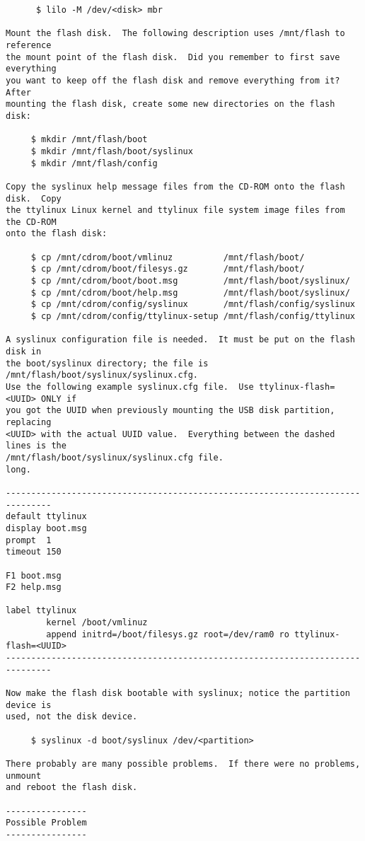 \documentclass[10pt]{article}
\begin{document}
\begin{lstlisting}
      $ lilo -M /dev/<disk> mbr

Mount the flash disk.  The following description uses /mnt/flash to reference
the mount point of the flash disk.  Did you remember to first save everything
you want to keep off the flash disk and remove everything from it?  After
mounting the flash disk, create some new directories on the flash disk:

     $ mkdir /mnt/flash/boot
     $ mkdir /mnt/flash/boot/syslinux
     $ mkdir /mnt/flash/config

Copy the syslinux help message files from the CD-ROM onto the flash disk.  Copy
the ttylinux Linux kernel and ttylinux file system image files from the CD-ROM
onto the flash disk:

     $ cp /mnt/cdrom/boot/vmlinuz          /mnt/flash/boot/
     $ cp /mnt/cdrom/boot/filesys.gz       /mnt/flash/boot/
     $ cp /mnt/cdrom/boot/boot.msg         /mnt/flash/boot/syslinux/
     $ cp /mnt/cdrom/boot/help.msg         /mnt/flash/boot/syslinux/
     $ cp /mnt/cdrom/config/syslinux       /mnt/flash/config/syslinux
     $ cp /mnt/cdrom/config/ttylinux-setup /mnt/flash/config/ttylinux

A syslinux configuration file is needed.  It must be put on the flash disk in
the boot/syslinux directory; the file is /mnt/flash/boot/syslinux/syslinux.cfg.
Use the following example syslinux.cfg file.  Use ttylinux-flash=<UUID> ONLY if
you got the UUID when previously mounting the USB disk partition, replacing
<UUID> with the actual UUID value.  Everything between the dashed lines is the
/mnt/flash/boot/syslinux/syslinux.cfg file.
long.

-------------------------------------------------------------------------------
default ttylinux
display boot.msg
prompt  1
timeout 150

F1 boot.msg
F2 help.msg

label ttylinux
        kernel /boot/vmlinuz
        append initrd=/boot/filesys.gz root=/dev/ram0 ro ttylinux-flash=<UUID>
-------------------------------------------------------------------------------

Now make the flash disk bootable with syslinux; notice the partition device is
used, not the disk device.

     $ syslinux -d boot/syslinux /dev/<partition>

There probably are many possible problems.  If there were no problems, unmount
and reboot the flash disk.

----------------
Possible Problem
----------------


\end{lstlisting}
\end{document}
